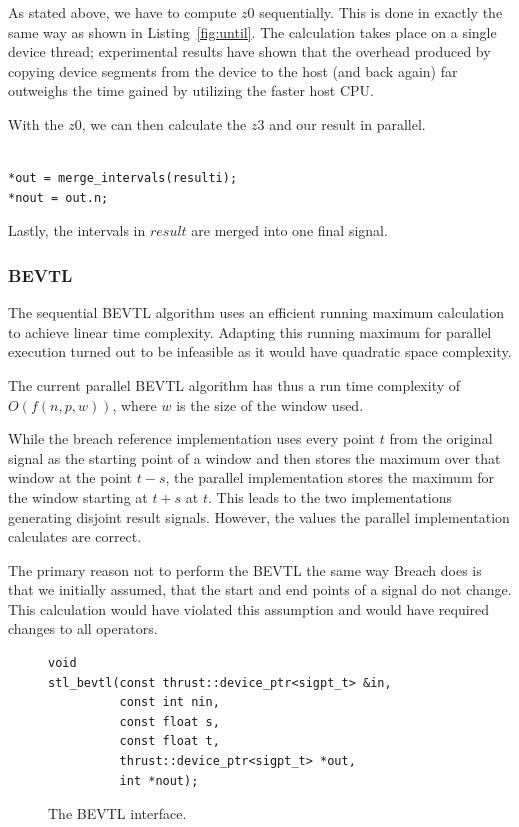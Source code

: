 \documentclass[a4paper,10pt]{article}
\begin{document}
As stated above, we have to compute $z0$ sequentially. This is done in exactly the
same way as shown in Listing~\ref{fig:until}. The calculation takes place on a single
device thread; experimental results have shown that the overhead produced by
copying device segments from the device to the host (and back again) far outweighs
the time gained by utilizing the faster host CPU.

With the $z0$, we can then calculate the $z3$ and our result in parallel.

\begin{lstlisting}

*out = merge_intervals(resulti);
*nout = out.n;

\end{lstlisting}

Lastly, the intervals in $result$ are merged into one final signal.

\subsubsection{BEVTL}

The sequential BEVTL algorithm uses an efficient running maximum calculation to
achieve linear time complexity. Adapting this running maximum for parallel execution
turned out to be infeasible as it would have quadratic space complexity.

The current parallel BEVTL algorithm has thus a run time complexity of $O(f(n,p,w))$,
where $w$ is the size of the window used.

While the breach reference implementation uses every point $t$ from the original
signal as the starting point of a window and then stores the maximum over that window
at the point $t - s$, the parallel implementation stores the maximum for the window
starting at $t + s$ at $t$. This leads to the two implementations generating disjoint
result signals. However, the values the parallel implementation calculates are
correct.

The primary reason not to perform the BEVTL the same way Breach does is that we
initially assumed, that the start and end points of a signal do not change. This
calculation would have violated this assumption and would have required changes to
all operators.

\begin{figure}[H]
\begin{lstlisting}
void
stl_bevtl(const thrust::device_ptr<sigpt_t> &in,
          const int nin,
          const float s,
          const float t,
          thrust::device_ptr<sigpt_t> *out,
          int *nout);
\end{lstlisting}
\caption{
\label{fig:parallel_bevtl}
The BEVTL interface.}
\end{figure}
\end{document}
